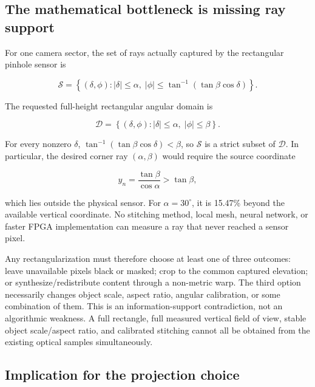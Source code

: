 \documentclass[10pt]{article}
\begin{document}
\subsection{The mathematical bottleneck is missing ray support}

For one camera sector, the set of rays actually captured by the rectangular pinhole sensor is

\begin{equation}
\mathcal S
=
\left\{(\delta,\phi): |\delta|\le\alpha,\;
|\phi|\le\tan^{-1}(\tan\beta\cos\delta)\right\}.
\end{equation}

The requested full-height rectangular angular domain is

\begin{equation}
\mathcal D
=
\left\{(\delta,\phi): |\delta|\le\alpha,\;|\phi|\le\beta\right\}.
\end{equation}

For every nonzero $\delta$, $\tan^{-1}(\tan\beta\cos\delta)<\beta$, so $\mathcal S$ is a strict subset of $\mathcal D$. In particular, the desired corner ray $(\alpha,\beta)$ would require the source coordinate

\begin{equation}
y_n=\frac{\tan\beta}{\cos\alpha}>\tan\beta,
\end{equation}

which lies outside the physical sensor. For $\alpha=30^\circ$, it is 15.47\% beyond the available vertical coordinate. No stitching method, local mesh, neural network, or faster FPGA implementation can measure a ray that never reached a sensor pixel.

Any rectangularization must therefore choose at least one of three outcomes: leave unavailable pixels black or masked; crop to the common captured elevation; or synthesize/redistribute content through a non-metric warp. The third option necessarily changes object scale, aspect ratio, angular calibration, or some combination of them. This is an information-support contradiction, not an algorithmic weakness. A full rectangle, full measured vertical field of view, stable object scale/aspect ratio, and calibrated stitching cannot all be obtained from the existing optical samples simultaneously.

\subsection{Implication for the projection choice}
\end{document}
